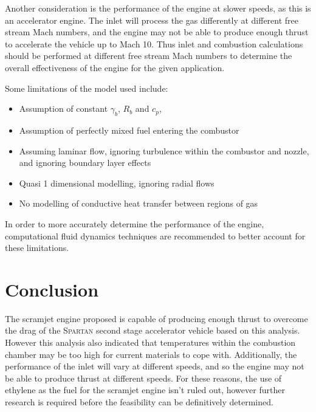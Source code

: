 \documentclass[a4paper]{article}
\begin{document}
Another consideration is the performance of the engine at slower speeds, as this is an accelerator engine. The inlet will process the gas differently at different free stream Mach numbers, and the engine may not be able to produce enough thrust to accelerate the vehicle up to Mach 10. Thus inlet and combustion calculations should be performed at different free stream Mach numbers to determine the overall effectiveness of the engine for the given application. 

Some limitations of the model used include:

\begin{itemize}
    \item Assumption of constant \(\gamma_b\), \(R_b\) and \(c_p\),
    \item Assumption of perfectly mixed fuel entering the combustor
    \item Assuming laminar flow, ignoring turbulence within the combustor and nozzle, and ignoring boundary layer effects
    \item Quasi 1 dimensional modelling, ignoring radial flows
    \item No modelling of conductive heat transfer between regions of gas
\end{itemize}

In order to more accurately determine the performance of the engine, computational fluid dynamics techniques are recommended to better account for these limitations.

\section{Conclusion}
The scramjet engine proposed is capable of producing enough thrust to overcome the drag of the \textsc{Spartan} second stage accelerator vehicle based on this analysis. However this analysis also indicated that temperatures within the combustion chamber may be too high for current materials to cope with. Additionally, the performance of the inlet will vary at different speeds, and so the engine may not be able to produce thrust at different speeds. For these reasons, the use of ethylene as the fuel for the scramjet engine isn't ruled out, however further research is required before the feasibility can be definitively determined.

\newpage
\appendix
\end{document}
